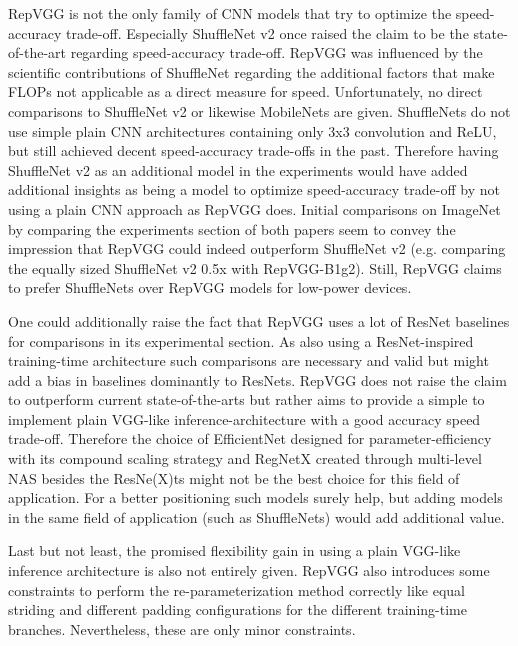 RepVGG is not the only family of CNN models that try to optimize the speed-accuracy trade-off. Especially ShuffleNet v2 \cite{NingningMa.2018} once raised the claim to be the state-of-the-art regarding speed-accuracy trade-off. RepVGG was influenced by the scientific contributions of ShuffleNet regarding the additional factors that make FLOPs not applicable as a direct measure for speed. Unfortunately, no direct comparisons to ShuffleNet v2 or likewise MobileNets \cite{AndrewGHoward.2017} are given. ShuffleNets do not use simple plain CNN architectures containing only 3x3 convolution and ReLU, but still achieved decent speed-accuracy trade-offs in the past. Therefore having ShuffleNet v2 as an additional model in the experiments would have added additional insights as being a model to optimize speed-accuracy trade-off by not using a plain CNN approach as RepVGG does. Initial comparisons on ImageNet \cite{JiaDeng.2009} by comparing the experiments section of both papers seem to convey the impression that RepVGG could indeed outperform ShuffleNet v2 (e.g. comparing the equally sized ShuffleNet v2 0.5x with RepVGG-B1g2). Still, RepVGG claims to prefer ShuffleNets over RepVGG models for low-power devices. 

One could additionally raise the fact that RepVGG uses a lot of ResNet \cite{KaimingHe.2015} baselines for comparisons in its experimental section. As also using a ResNet-inspired training-time architecture such comparisons are necessary and valid but might add a bias in baselines dominantly to ResNets. RepVGG does not raise the claim to outperform current state-of-the-arts but rather aims to provide a simple to implement plain VGG-like inference-architecture with a good accuracy speed trade-off. Therefore the choice of EfficientNet \cite{LeMingxingTan.2019} designed for parameter-efficiency with its compound scaling strategy and RegNetX \cite{IlijaRadosavovic.2020} created through multi-level NAS besides the ResNe(X)ts \cite{SainingXie.2017} might not be the best choice for this field of application. For a better positioning such models surely help, but adding models in the same field of application (such as ShuffleNets) would add additional value.

Last but not least, the promised flexibility gain in using a plain VGG-like inference architecture is also not entirely given. RepVGG also introduces some constraints to perform the re-parameterization method correctly like equal striding and different padding configurations for the different training-time branches. Nevertheless, these are only minor constraints. 
